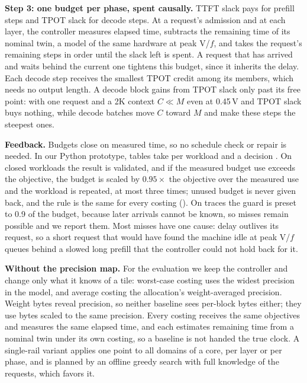 \textbf{Step 3: one budget per phase, spent causally.}
TTFT slack pays for prefill steps and TPOT slack for decode steps.
At a request's admission and at each layer, the controller measures elapsed time, subtracts the remaining time of its nominal twin, a model of the same hardware at peak V/$f$, and takes the request's remaining steps in order until the slack left is spent.
A request that has arrived and waits behind the current one tightens this budget, since it inherits the delay.
Each decode step receives the smallest TPOT credit among its members, which needs no output length.
A decode block gains from TPOT slack only past its free point: with one request and a 2K context $C\ll M$ even at 0.45\,V and TPOT slack buys nothing, while decode batches move $C$ toward $M$ and make these steps the steepest ones.

\textbf{Feedback.}
Budgets close on measured time, so no schedule check or repair is needed. In our Python prototype, tables take  per workload and a decision .
On closed workloads the result is validated, and if the measured budget use exceeds the objective, the budget is scaled by $0.95\times$ the objective over the measured use and the workload is repeated, at most three times; unused budget is never given back, and the rule is the same for every costing (). On traces the guard is preset to 0.9 of the budget, because later arrivals cannot be known, so misses remain possible and we report them. Most misses have one cause: delay outlives its request, so a short request that would have found the machine idle at peak V/$f$ queues behind a slowed long prefill that the controller could not hold back for it.

\textbf{Without the precision map.}
For the evaluation we keep the controller and change only what it knows of a tile: worst-case costing uses the widest precision in the model, and average costing the allocation's weight-averaged precision.
Weight bytes reveal precision, so neither baseline sees per-block bytes either; they use bytes scaled to the same precision.
Every costing receives the same objectives and measures the same elapsed time, and each estimates remaining time from a nominal twin under its own costing, so a baseline is not handed the true clock.
A single-rail variant applies one point to all domains of a core, per layer or per phase, and is planned by an offline greedy search with full knowledge of the requests, which favors it.
